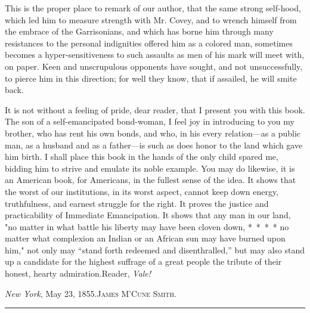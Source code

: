 This is the proper place to remark of our author, that the same strong
self-hood, which led him to measure strength with Mr. Covey, and to
wrench himself from the embrace of the Garrisonians, and which has borne
him through many resistances to the personal indignities offered him as
a colored man, sometimes becomes a hyper-sensitiveness to such assaults
as men of his mark will meet with, on paper. Keen and unscrupulous
opponents have sought, and not unsuccessfully, to pierce him in this
direction; for well they know, that if assailed, he will smite back.

It is not without a feeling of pride, dear reader, that I present you
with this book. The son of a self-emancipated bond-woman, I feel joy in
introducing to you my brother, who has rent his own bonds, and who, in
his every relation---as a public man, as a husband and as a father---is
such as does honor to the land which gave him birth. I shall place this
book in the hands of the only child spared me, bidding him to strive and
emulate its noble example. You may do likewise, it is an American book,
for Americans, in the fullest sense of the idea. It shows that the worst
of our institutions, in its worst aspect, cannot keep down energy,
truthfulness, and earnest struggle for the right. It proves the justice
and practicability of Immediate Emancipation. It shows that any man in
our land, "no matter in what battle his liberty may have been cloven
down, {*~*~*~*} no matter what complexion an Indian or an African sun
may have burned upon him," not only may ``stand forth redeemed and
disenthralled,'' but may also stand up a candidate for the highest
suffrage of a great people the tribute of their honest, hearty
admiration.{}Reader, \emph{Vale!}

{}\emph{New York}, May 23, 1855.{\textsc{James M'Cune Smith.}}

\begin{center}\rule{0.5\linewidth}{\linethickness}\end{center}

